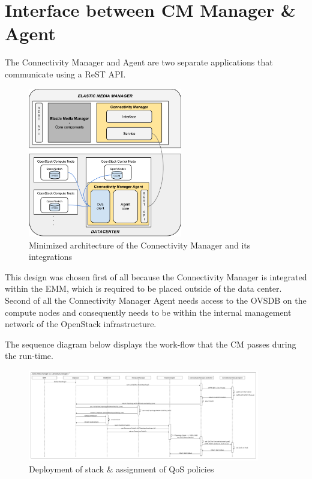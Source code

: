 \section{Interface between CM Manager \& Agent}

The Connectivity Manager and Agent are two separate applications that communicate using a ReST API. 

\begin{figure}[H]
\centering

\includegraphics[width=0.6\textwidth]{images/design/modular_architecture_cm_cma}

\caption{Minimized architecture of the Connectivity Manager and its integrations}
\end{figure}

This design was chosen first of all because the Connectivity Manager is integrated within the EMM, which is required to be placed outside of the data center. Second of all the Connectivity Manager Agent needs access to the OVSDB on the compute nodes and consequently needs to be within the internal management network of the OpenStack infrastructure.

The sequence diagram below displays the work-flow that the CM passes during the run-time.

\begin{figure}[H]
\centering

\includegraphics[width=0.9\textwidth]{images/design/sequence_diagram}

\caption{Deployment of stack \& assignment of QoS policies}
\end{figure}

